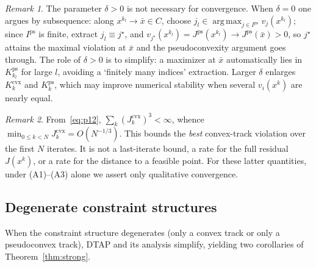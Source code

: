 \documentclass[]{interact}
\theoremstyle{plain}
\theoremstyle{definition}
\theoremstyle{remark}
\newtheorem{remark}{Remark}
\DeclareMathOperator*{\argmax}{arg\,max}
\newcommand{\cvx}{\mathrm{cvx}}
\newcommand{\ps}{\mathrm{ps}}
\newcommand{\dtap}{\textsc{DTAP}}
\begin{document}
\begin{remark}\label{rem:delta-role}
The parameter $\delta>0$ is not necessary for convergence. When $\delta=0$ one argues by
subsequence: along $x^{k_l}\to\bar x\in C$, choose
$j_l\in\argmax_{j\in I^{\ps}}v_j(x^{k_l})$; since $I^{\ps}$ is finite, extract
$j_l\equiv j^\star$, and $v_{j^\star}(x^{k_l})=J^{\ps}(x^{k_l})\to J^{\ps}(\bar x)>0$, so
$j^\star$ attains the maximal violation at $\bar x$ and the pseudoconvexity argument
goes through. The role of $\delta>0$ is to simplify: a maximizer at $\bar x$ automatically
lies in $K^{\ps}_{k_l}$ for large $l$, avoiding a `finitely many indices' extraction.
Larger $\delta$ enlarges $K^{\cvx}_k$ and $K^{\ps}_k$, which may improve numerical
stability when several $v_i(x^k)$ are nearly equal.
\end{remark}

\begin{remark}\label{rem:rate}
From~\eqref{eq:p12}, $\sum_k(J^{\cvx}_k)^3<\infty$, whence
$\min_{0\le k<N}J^{\cvx}_k=O(N^{-1/3})$. This bounds the \emph{best} convex-track violation
over the first $N$ iterates. It is not a last-iterate bound, a rate for the full residual
$J(x^k)$, or a rate for the distance to a feasible point. For these latter quantities,
under (A1)--(A3) alone we assert only qualitative convergence.
\end{remark}

\subsection{Degenerate constraint structures}\label{ssec:degenerate}
When the constraint structure degenerates (only a convex track or only a pseudoconvex
track), \dtap{} and its analysis simplify, yielding two corollaries of
Theorem~\ref{thm:strong}.
\end{document}
